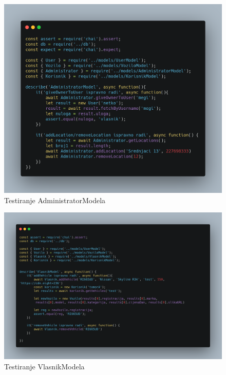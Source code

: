 \begin{flushleft}
			\begin{figure}[hp]
                    \centering
                    \includegraphics[width=15cm]{slike/AdministratorModel.png}
                    \caption{Testiranje AdministratorModela}
                    \label{fig:useCase-2}
                \end{figure}
			\eject 
			
			
			\begin{figure}[hp]
                    \centering
                    \includegraphics[width=15cm]{slike/VlasnikModel.png}
                    \caption{Testiranje VlasnikModela}
                    \label{fig:useCase-2}
                \end{figure}
			\eject 
			

\end{flushleft}
